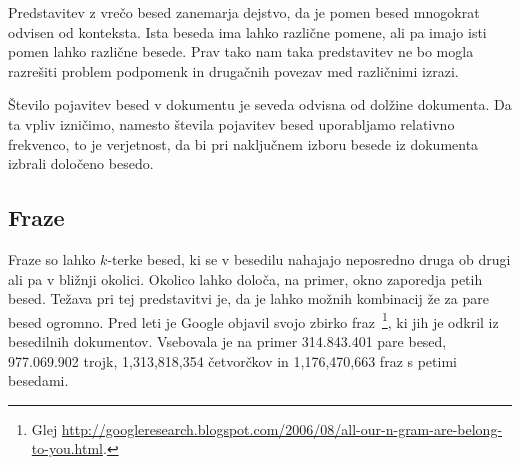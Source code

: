 Predstavitev z vrečo besed zanemarja dejstvo, da je pomen besed
mnogokrat odvisen od konteksta. Ista beseda ima lahko različne pomene,
ali pa imajo isti pomen lahko različne besede. Prav tako nam taka
predstavitev ne bo mogla razrešiti problem podpomenk in drugačnih
povezav med različnimi izrazi.

Število pojavitev besed v dokumentu je seveda odvisna od dolžine
dokumenta. Da ta vpliv izničimo, namesto števila pojavitev besed
uporabljamo relativno frekvenco, to je verjetnost, da bi pri
naključnem izboru besede iz dokumenta izbrali določeno besedo.

\subsection{Fraze}

Fraze so lahko $k$-terke besed, ki se v besedilu nahajajo neposredno
druga ob drugi ali pa v bližnji okolici. Okolico lahko določa, na
primer, okno zaporedja petih besed. Težava pri tej predstavitvi je, da
je lahko možnih kombinacij že za pare besed ogromno. Pred leti je
Google objavil svojo zbirko fraz~\footnote{Glej
  \url{http://googleresearch.blogspot.com/2006/08/all-our-n-gram-are-belong-to-you.html}.},
ki jih je odkril iz besedilnih dokumentov. Vsebovala je na primer
314.843.401 pare besed, 977.069.902 trojk, 1,313,818,354 četvorčkov in
1,176,470,663 fraz s petimi besedami.


